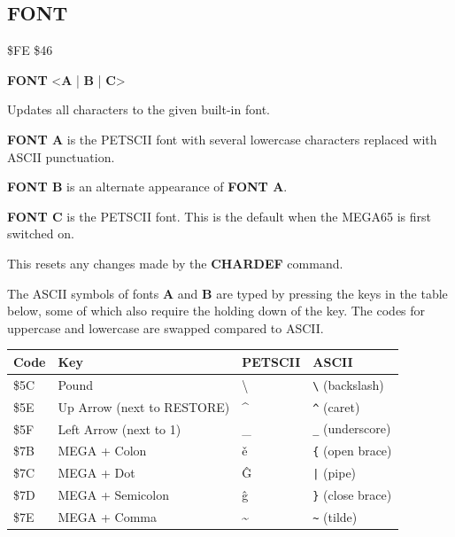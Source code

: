 \subsection{FONT}
\begin{description}[leftmargin=2cm,style=nextline]
\item [Token:] \$FE \$46
\item [Format:] {\bf FONT} <{\bf A} | {\bf B} | {\bf C}>
\item [Usage:] Updates all characters to the given built-in font.

               {\bf FONT A} is the PETSCII font with several lowercase characters replaced with ASCII punctuation.

               {\bf FONT B} is an alternate appearance of {\bf FONT A}.

               {\bf FONT C} is the PETSCII font. This is the default when the MEGA65 is first switched on.

               This resets any changes made by the {\bf CHARDEF} command.

               The ASCII symbols of fonts {\bf A} and {\bf B} are typed by pressing the keys in the table below,
               some of which also require the holding down of the \megasymbolkey key.
               The codes for uppercase and lowercase are swapped compared to ASCII.
\begin{center}
{\setlength{\tabcolsep}{1mm}
  \begin{tabular}{|C{1cm}|L{4.5cm}|C{1.4cm}|L{2.3cm}|}
\hline
{\bf Code}  & {\bf Key} & {\bf PETSCII} & {\bf ASCII}  \\
\hline
    \$5C & Pound      & {\codefont \textbackslash}   & {\tt \textbackslash} (backslash) \\
    \$5E & Up Arrow (next to RESTORE)  & {\codefont \textasciicircum} & {\tt \textasciicircum} (caret) \\
    \$5F & Left Arrow (next to 1)      & {\codefont \_}               & {\tt \_} (underscore)   \\
    \$7B & MEGA + Colon                & {\codefont ě }               & {\tt \{} (open brace)   \\
    \$7C & MEGA + Dot                  & {\codefont Ĝ }               & {\tt |} (pipe)  \\
    \$7D & MEGA + Semicolon            & {\codefont ĝ }               & {\tt \}} (close brace)  \\
    \$7E & MEGA + Comma                & {\codefont \textasciitilde}  & {\tt \textasciitilde} (tilde)   \\
\hline
\end{tabular}
}
\end{center}


\end{description}
